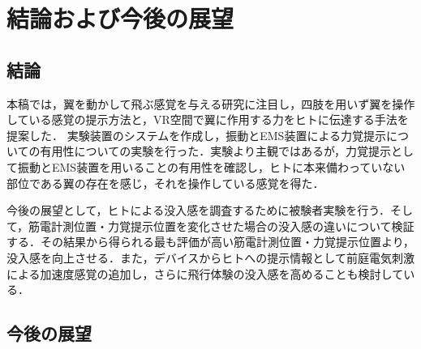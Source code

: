 \chapter[結論および今後の展望]%
        {結論および今後の展望}

\section{結論}
    本稿では，翼を動かして飛ぶ感覚を与える研究に注目し，四肢を用いず翼を操作している感覚の提示方法と，VR空間で翼に作用する力をヒトに伝達する手法を提案した．
    実験装置のシステムを作成し，振動とEMS装置による力覚提示についての有用性についての実験を行った．実験より主観ではあるが，力覚提示として振動とEMS装置を用いることの有用性を確認し，ヒトに本来備わっていない部位である翼の存在を感じ，それを操作している感覚を得た．
  
    今後の展望として，ヒトによる没入感を調査するために被験者実験を行う．そして，筋電計測位置・力覚提示位置を変化させた場合の没入感の違いについて検証する．その結果から得られる最も評価が高い筋電計測位置・力覚提示位置より，没入感を向上させる．また，デバイスからヒトへの提示情報として前庭電気刺激による加速度感覚\cite{maeda2005shaking}\cite{青山一真2014前庭電気刺激における逆方向不感電流を用いた加速度感覚の増強}の追加し，さらに飛行体験の没入感を高めることも検討している．
  
\section{今後の展望}